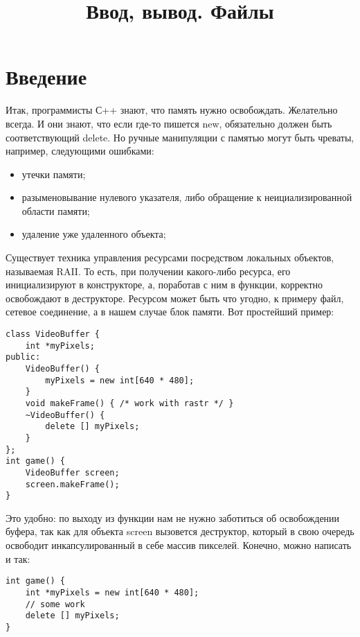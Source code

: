 \documentclass {article}
\date{}
\title{{Ввод, вывод. Файлы}}
\begin{document}
\maketitle
\section{Введение}
Итак, программисты С++ знают, что память нужно освобождать. Желательно всегда. И они знают, что если где-то пишется new, обязательно должен быть соответствующий delete. Но ручные манипуляции с памятью могут быть чреваты, например, следующими ошибками:
\begin{itemize}
\item утечки памяти;
\item разыменовывание нулевого указателя, либо обращение к неициализированной области памяти;
\item удаление уже удаленного объекта;
\end{itemize}
Существует техника управления ресурсами посредством локальных объектов, называемая RAII. То есть, при получении какого-либо ресурса, его инициализируют в конструкторе, а, поработав с ним в функции, корректно освобождают в деструкторе. Ресурсом может быть что угодно, к примеру файл, сетевое соединение, а в нашем случае блок памяти. Вот простейший пример:
\begin{lstlisting}[caption=Пример]
class VideoBuffer {
    int *myPixels;
public:
    VideoBuffer() {
        myPixels = new int[640 * 480];
    }
    void makeFrame() { /* work with rastr */ }
    ~VideoBuffer() {
        delete [] myPixels;
    }
};
int game() {
    VideoBuffer screen;
    screen.makeFrame();
}
\end{lstlisting}
Это удобно: по выходу из функции нам не нужно заботиться об освобождении буфера, так как для объекта screen вызовется деструктор, который в свою очередь освободит инкапсулированный в себе массив пикселей. Конечно, можно написать и так:
\begin{lstlisting}[caption=Пример]
int game() {
    int *myPixels = new int[640 * 480];
    // some work
    delete [] myPixels;
}
\end{lstlisting}
\end{document}
